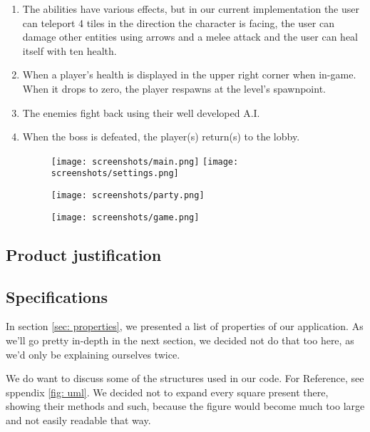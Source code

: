 \documentclass[../main.tex]{subfiles}
\begin{document}
\begin{enumerate}
		\item The abilities have various effects, but in our current implementation the user can teleport 4 tiles in the direction the character is facing, the user can damage other entities using arrows and a melee attack and the user can heal itself with ten health.
		\item When a player's health is displayed in the upper right corner when in-game. When it drops to zero, the player respawns at the level's spawnpoint.		
		\item The enemies fight back using their well developed A.I.
		\item When the boss is defeated, the player(s) return(s) to the lobby.
		
		\begin{figure}[H]
			\centering
					\begin{minipage}{0.45\textwidth}
						\texttt{[image: screenshots/main.png]}
						\texttt{[image: screenshots/settings.png]}
					\end{minipage}
					\end{figure}
		\begin{figure}[H]
    	\centering
    	\texttt{[image: screenshots/party.png]}
  	\end{figure}
		\begin{figure}[H]
    	\centering
    	\texttt{[image: screenshots/game.png]}
  	\end{figure}

    \end{enumerate}

	\subsection{Product justification}

	\subsection{Specifications}
	In section \ref{sec: properties}, we presented a list of properties of our application. As we'll go pretty in-depth in the next section, we decided not do that too here, as we'd only be explaining ourselves twice. 
	
	We do want to discuss some of the structures used in our code. For Reference, see sppendix \ref{fig: uml}. We decided not to expand every square present there, showing their methods and such, because the figure would become much too large and not easily readable that way.
\end{document}
